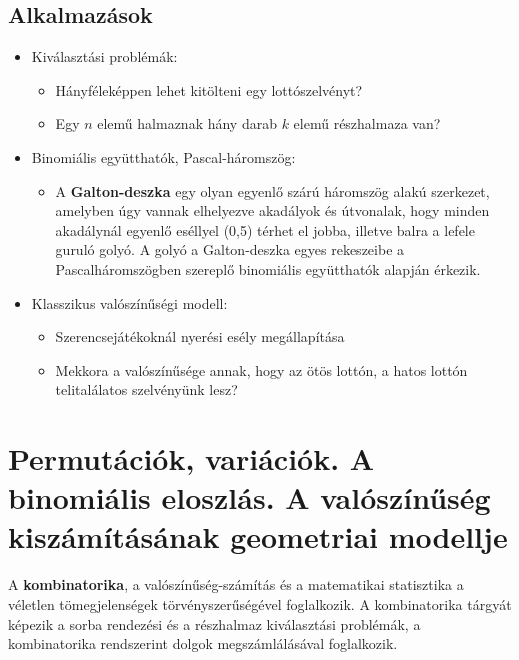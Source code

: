 \documentclass[12pt,a4paper]{article}
\begin{document}
\subsection{Alkalmazások}
\begin{itemize}
\item Kiválasztási problémák:
\begin{itemize}
\item Hányféleképpen lehet kitölteni egy lottószelvényt?
\item Egy $n$ elemű halmaznak hány darab $k$ elemű részhalmaza van?
\end{itemize}
\item Binomiális együtthatók, Pascal-háromszög:
\begin{itemize}
\item A \textbf{Galton-deszka} egy olyan egyenlő szárú háromszög alakú szerkezet, amelyben úgy vannak elhelyezve akadályok és útvonalak, hogy minden akadálynál egyenlő eséllyel (0,5) térhet el jobba, illetve balra a lefele guruló golyó. A golyó a Galton-deszka egyes rekeszeibe a Pascalháromszögben szereplő binomiális együtthatók alapján érkezik.
\end{itemize}
\item Klasszikus valószínűségi modell:
\begin{itemize}
\item Szerencsejátékoknál nyerési esély megállapítása
\item Mekkora a valószínűsége annak, hogy az ötös lottón, a hatos lottón telitalálatos szelvényünk lesz?
\end{itemize}
\end{itemize}


\newpage






\section{Permutációk, variációk. A binomiális eloszlás. A valószínűség kiszámításának geometriai modellje}
A \textbf{kombinatorika}, a valószínűség-számítás és a matematikai statisztika a véletlen tömegjelenségek törvényszerűségével foglalkozik. A kombinatorika tárgyát képezik a sorba rendezési és a részhalmaz kiválasztási problémák, a kombinatorika rendszerint dolgok megszámlálásával foglalkozik.
\end{document}
